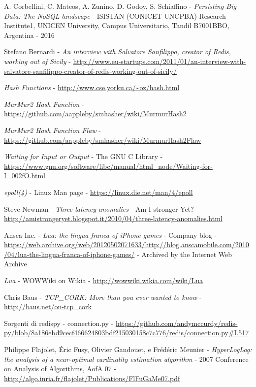 \begin{thebibliography}{99}

	A. Corbellini, C. Mateos, A. Zunino, D. Godoy, S. Schiaffino - 
	\emph{Persisting Big Data: The NoSQL landscape} - 
	ISISTAN (CONICET-UNCPBA) Research Institute1, UNICEN University, Campus Universitario, Tandil B7001BBO, Argentina - 
	2016

	Stefano Bernardi - 
	\emph{An interview with Salvatore Sanfilippo, creator of Redis, working out of Sicily} - 
	\url{http://www.eu-startups.com/2011/01/an-interview-with-salvatore-sanfilippo-creator-of-redis-working-out-of-sicily/}

	\emph{Hash Functions} - 
	\url{http://www.cse.yorku.ca/~oz/hash.html}

	\emph{MurMur2 Hash Function} -
	\url{https://github.com/aappleby/smhasher/wiki/MurmurHash2}

	\emph{MurMur2 Hash Function Flaw} -
	\url{https://github.com/aappleby/smhasher/wiki/MurmurHash2Flaw}

	\emph{Waiting for Input or Output} - 
	The GNU C Library - 
	\url{https://www.gnu.org/software/libc/manual/html_node/Waiting-for-I_002fO.html}

	\emph{epoll(4)} - 
	Linux Man page - 
	\url{https://linux.die.net/man/4/epoll}

	Steve Newman -
	\emph{Three latency anomalies} - 
	Am I stronger Yet? - 
	\url{http://amistrongeryet.blogspot.it/2010/04/three-latency-anomalies.html}

	Ansca Inc. -
	\emph{Lua: the lingua franca of iPhone games} -
	Company blog -
	\url{https://web.archive.org/web/20120502071633/http://blog.anscamobile.com/2010/04/lua-the-lingua-franca-of-iphone-games/} -
	Archived by the Internet Web Archive

	\emph{Lua} -
	WOWWiki on Wikia -
	\url{http://wowwiki.wikia.com/wiki/Lua}

	Chris Baus -
	\emph{TCP\_CORK: More than you ever wanted to know} -
	\url{http://baus.net/on-tcp_cork}

	Sorgenti di redispy - connection.py -
	\url{https://github.com/andymccurdy/redis-py/blob/8a186ebd9cecf466624803bdf215030158c7c776/redis/connection.py\#L517}

	Philippe Flajolet, Éric Fusy, Olivier Gandouet, e Frédéric Meunier -
	\emph{HyperLogLog: the analysis of a near-optimal cardinality estimation algorithm} -
	2007 Conference on Analysis of Algorithms, AofA 07 -
	\url{http://algo.inria.fr/flajolet/Publications/FlFuGaMe07.pdf}


\end{thebibliography}
